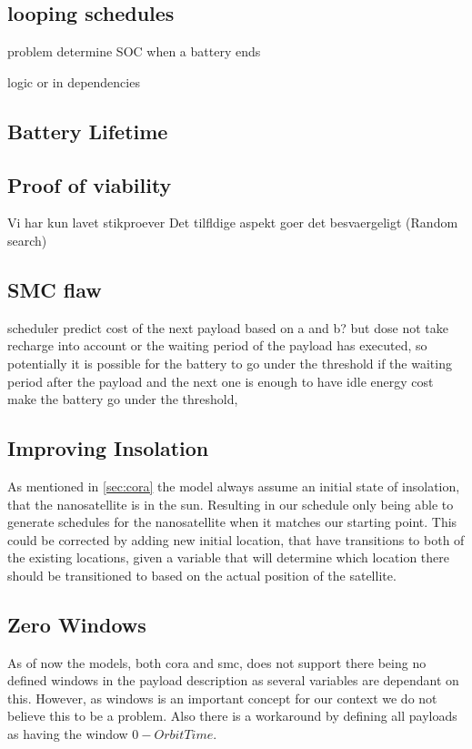 \subsection{looping schedules}
problem determine SOC when a battery ends 

logic or in dependencies

\subsection{Battery Lifetime} \label{subsec:disc_life}



\subsection{Proof of viability}
Vi har kun lavet stikproever
Det tilfldige aspekt goer det besvaergeligt (Random search)

\subsection{SMC flaw}
scheduler predict cost of the next payload based on a and b? but dose not take recharge into account or the waiting period of the payload has executed, so potentially it is possible for the battery to go under the threshold if the waiting period after the payload and the next one is enough to have idle energy cost make the battery go under the threshold,  

\subsection{Improving Insolation}
As mentioned in \cref{sec:cora} the model always assume an initial state of insolation, that the nanosatellite is in the sun. Resulting in our schedule only being able to generate schedules for the nanosatellite when it matches our starting point.
This could be corrected by adding new initial location, that have transitions to both of the existing locations, given a variable that will determine which location there should be transitioned to based on the actual position of the satellite.


\subsection{Zero Windows}
As of now the models, both \gls{cora} and \gls{smc}, does not support there being no defined windows in the payload description as several variables are dependant on this. However, as windows is an important concept for our context we do not believe this to be a problem. Also there is a workaround by defining all payloads as having the window $0-OrbitTime$.

